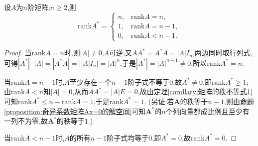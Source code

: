 \documentclass[../../main.tex]{subfiles}%
\begin{document}
\begin{theorem}[伴随矩阵的秩]\label{theorem:伴随矩阵的秩}
设\(A\)为\(n\)阶矩阵,\(n\geqslant  2\),则
\[
\mathrm{rank}A^* = 
\begin{cases}
n, & \mathrm{rank}A = n, \\
1, & \mathrm{rank}A = n - 1, \\
0, & \mathrm{rank}A < n - 1.
\end{cases}
\]
\end{theorem}
\begin{proof}

当\(\mathrm{rank}A = n\)时,则\(\vert A\vert\neq 0\),\(A\)可逆,又$AA^*=A^*A=\left| A \right|I_n$,两边同时取行列式,可得\(\left| A^* \right|\cdot \left| A \right|=\left| A^*A \right|=\left| \left| A \right|I_n \right|=\left| A \right|^n
\),于是$\left| A^* \right|=\left| A \right|^{n-1}\ne 0$.所以\(\mathrm{rank}A^* = n\).

当\(\mathrm{rank}A = n - 1\)时,\(A\)至少存在一个\(n - 1\)阶子式不等于\(0\),故\(A^*\neq 0\),即\(\mathrm{rank}A^*\geqslant  1\);由\(\mathrm{rank}A < n\)知\(\vert A\vert = 0\),从而\(AA^* = \vert A\vert E = 0\),故由\hyperref[corollary:矩阵的秩不等式1]{定理\ref{corollary:矩阵的秩不等式1}}可知\(\mathrm{rank}A^* \leqslant  n - \mathrm{rank}A = 1\),于是\(\mathrm{rank}A^* = 1\).
(另证:若\(\boldsymbol{A}\)的秩等于\(n - 1\),则由\hyperref[proposition:奇异系数矩阵Ax=0的解空间]{命题\ref{proposition:奇异系数矩阵Ax=0的解空间}}可知\(\boldsymbol{A}^*\)的\(n\)个列向量都成比例且至少有一列不为零,故\(\boldsymbol{A}^*\)的秩等于\(1\).)

当\(\mathrm{rank}A < n - 1\)时,\(A\)的所有\(n - 1\)阶子式均等于\(0\),即\(A^* = 0\),故\(\mathrm{rank}A^* = 0\).

\end{proof}
\end{document}

